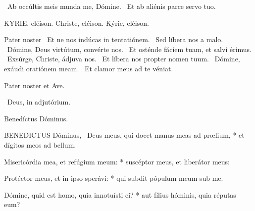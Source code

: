 \V\ Ab occúltis meis munda me, Dómine. \R\ Et ab aliénis parce servo tuo.



KYRIE, eléison. Christe, eléison. Kýrie, eléison.

Pater noster  \V\ Et ne nos indúcas in tentatiónem. \R\ Sed líbera nos a malo. \V\ Dómine, Deus virtútum, convérte nos. \R\ Et osténde fáciem tuam, et salvi érimus. \V\ Exsúrge, Christe, ádjuva nos. \R\ Et líbera nos propter nomen tuum. \V\ Dómine, exáudi oratiónem meam. \R\ Et clamor meus ad te véniat.



Pater noster et Ave.

\V\ Deus, in adjutórium.

 Benedíctus Dóminus. \textdagger



\lettrine[lines=2]{B}{ENEDICTUS} Dóminus, \textdagger\ Deus meus, qui docet manus meas ad prœlium, * et dígitos meos ad bellum.

Misericórdia mea, et refúgium meum: * suscéptor meus, et liberátor meus:

Protéctor meus, et in ipso sperávi: * qui subdit pópulum meum sub me.

Dómine, quid est homo, quia innotuísti ei? * aut fílius hóminis, quia réputas eum?

